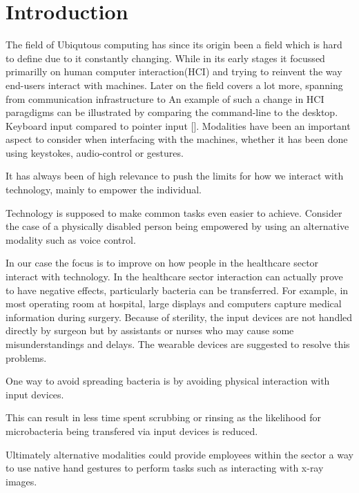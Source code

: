 \section{Introduction}
The field of Ubiqutous computing has since its origin been a field which is hard to define due to it constantly changing.
While in its early stages it focussed primarilly on human computer interaction(HCI) 
and trying to reinvent the way end-users interact with machines.
Later on the field covers a lot more, spanning from communication infrastructure to 
An example of such a change in HCI paragdigms can be illustrated by comparing the command-line to the desktop. Keyboard input compared to pointer input [\cite{}].
Modalities have been an important aspect
to consider when interfacing with the machines, whether it has been done using keystokes, audio-control or gestures.

It has always been of high relevance to push the limits for how we interact with technology, mainly to empower the individual.

Technology is supposed to make common tasks even easier to achieve. Consider the case of a physically disabled person being empowered by using an alternative modality such as voice control.

In our case the focus is to improve on how people in the healthcare sector interact with technology.
In the healthcare sector interaction can actually prove to have negative effects, particularly bacteria can be transferred.
For example, in most operating room at hospital, large displays and computers capture medical information during surgery. Because of sterility, the input devices are not handled directly by surgeon but by assistants or nurses who may cause some misunderstandings and delays\cite{Pederson:2015}. The wearable devices are suggested to resolve this problems.

One way to avoid spreading bacteria is by avoiding physical interaction with input devices.

This can result in less time spent scrubbing or rinsing as the likelihood for microbacteria being 
transfered via input devices is reduced.


Ultimately alternative modalities could provide employees within the sector a 
way to use native hand gestures to perform tasks such as interacting with x-ray images.
